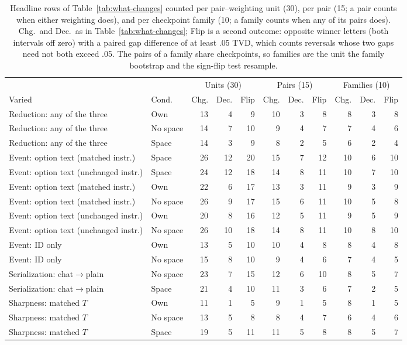 \begin{table}[t]
\centering\scriptsize
\setlength{\tabcolsep}{2.5pt}
\begin{tabular}{@{}llrrrrrrrrr@{}}
\toprule
& & \multicolumn{3}{c}{Units (30)} & \multicolumn{3}{c}{Pairs (15)} & \multicolumn{3}{c}{Families (10)} \\
\cmidrule(lr){3-5}\cmidrule(lr){6-8}\cmidrule(l){9-11}
Varied & Cond. & Chg. & Dec. & Flip & Chg. & Dec. & Flip & Chg. & Dec. & Flip \\
\midrule
Reduction: any of the three & Own & 13 & 4 & 9 & 10 & 3 & 8 & 8 & 3 & 8 \\
Reduction: any of the three & No space & 14 & 7 & 10 & 9 & 4 & 7 & 7 & 4 & 6 \\
Reduction: any of the three & Space & 14 & 3 & 9 & 8 & 2 & 5 & 6 & 2 & 4 \\
Event: option text (matched instr.) & Space & 26 & 12 & 20 & 15 & 7 & 12 & 10 & 6 & 10 \\
Event: option text (unchanged instr.) & Space & 24 & 12 & 18 & 14 & 8 & 11 & 10 & 7 & 10 \\
Event: option text (matched instr.) & Own & 22 & 6 & 17 & 13 & 3 & 11 & 9 & 3 & 9 \\
Event: option text (matched instr.) & No space & 26 & 9 & 17 & 15 & 6 & 11 & 10 & 5 & 8 \\
Event: option text (unchanged instr.) & Own & 20 & 8 & 16 & 12 & 5 & 11 & 9 & 5 & 9 \\
Event: option text (unchanged instr.) & No space & 26 & 10 & 18 & 14 & 8 & 11 & 10 & 8 & 10 \\
Event: ID only & Own & 13 & 5 & 10 & 10 & 4 & 8 & 8 & 4 & 8 \\
Event: ID only & No space & 15 & 8 & 10 & 9 & 4 & 6 & 7 & 4 & 5 \\
Serialization: chat$\to$plain & No space & 23 & 7 & 15 & 12 & 6 & 10 & 8 & 5 & 7 \\
Serialization: chat$\to$plain & Space & 21 & 4 & 10 & 11 & 3 & 6 & 7 & 2 & 5 \\
Sharpness: matched $T$ & Own & 11 & 1 & 5 & 9 & 1 & 5 & 8 & 1 & 5 \\
Sharpness: matched $T$ & No space & 13 & 5 & 8 & 8 & 4 & 7 & 6 & 4 & 6 \\
Sharpness: matched $T$ & Space & 19 & 5 & 11 & 11 & 5 & 8 & 8 & 5 & 7 \\
\bottomrule
\end{tabular}
\caption{Headline rows of Table~\ref{tab:what-changes} counted per pair--weighting unit (30), per pair (15; a pair counts when either weighting does), and per checkpoint family (10; a family counts when any of its pairs does). Chg.\ and Dec.\ as in Table~\ref{tab:what-changes}; Flip is a second outcome: opposite winner letters (both intervals off zero) with a paired gap difference of at least .05 TVD, which counts reversals whose two gaps need not both exceed .05. The pairs of a family share checkpoints, so families are the unit the family bootstrap and the sign-flip test resample.}
\label{tab:pair-family-counts}
\end{table}
